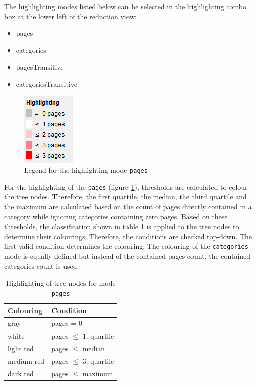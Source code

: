 \documentclass{scrartcl}
\begin{document}
The highlighting modes listed below can be selected in the highlighting combo box at the lower left of the reduction view:

\begin{itemize}
	\item pages 
	\item categories
	\item pagesTransitive
	\item categoriesTransitive
\end{itemize}

\begin{figure}[ht]
\centering
\includegraphics[scale=0.6]{figures/highlighting_pages.png}
\caption{Legend for the highlighting mode \texttt{pages}}
\label{fig:highlighting_pages}
\end{figure}

For the highlighting of the \texttt{pages} (figure \ref{fig:highlighting_pages}), thresholds are calculated to colour the tree nodes. Therefore, the first quartile, the median, the third quartile and the maximum are calculated based on the count of pages directly contained in a category while ignoring categories containing zero pages. Based on these thresholds, the classification shown in table \ref{tab:highlighting_pages} is applied to the tree nodes to determine their colourings. Therefore, the conditions are checked top-down. The first valid condition determines the colouring. The colouring of the \texttt{categories} mode is equally defined but instead of the contained pages count, the contained categories count is used.

\begin{table}[ht]
\scriptsize
\centering
\begin{tabular}{ll}
\toprule 
\textbf{Colouring} & \textbf{Condition} \\
\midrule
gray & pages = 0 \\ 
\midrule
white & pages $\le$ 1. quartile \\ 
\midrule
light red & pages $\le$ median \\ 
\midrule
medium red & pages $\le$ 3. quartile \\ 
\midrule
dark red & pages $\le$ maximum \\ 
\bottomrule
\end{tabular} 
\caption{Highlighting of tree nodes for mode \texttt{pages}}
\label{tab:highlighting_pages}
\end{table}
\end{document}
